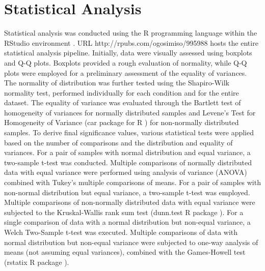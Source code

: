 \section{Statistical Analysis} \label{sec:Statistical Analysis}
Statistical analysis was conducted using the R programming language \cite{RCoreTeam2022R:Computing} within the RStudio environment \cite{RStudioTeam2022RStudio:RStudio}. URL http://rpubs.com/ogosimiso/995988 hosts the entire statistical analysis pipeline. Initially, data were visually assessed using boxplots and Q-Q plots. Boxplots provided a rough evaluation of normality, while Q-Q plots were employed for a preliminary assessment of the equality of variances. The normality of distribution was further tested using the Shapiro-Wilk normality test, performed individually for each condition and for the entire dataset. The equality of variance was evaluated through the Bartlett test of homogeneity of variances for normally distributed samples and Levene's Test for Homogeneity of Variance (car package for R \cite{Fox2019AnRegression}) for non-normally distributed samples. To derive final significance values, various statistical tests were applied based on the number of comparisons and the distribution and equality of variances. For a pair of samples with normal distribution and equal variance, a two-sample t-test was conducted. Multiple comparisons of normally distributed data with equal variance were performed using analysis of variance (ANOVA) combined with Tukey's multiple comparisons of means. For a pair of samples with non-normal distribution but equal variance, a two-sample t-test was employed. Multiple comparisons of non-normally distributed data with equal variance were subjected to the Kruskal-Wallis rank sum test (dunn.test R package \cite{Dinno2017Dunn.test:Sums}). For a single comparison of data with a normal distribution but non-equal variance, a Welch Two-Sample t-test was executed. Multiple comparisons of data with normal distribution but non-equal variance were subjected to one-way analysis of means (not assuming equal variances), combined with the Games-Howell test (rstatix R package \cite{Kassambara2022Rstatix:Tests}).

